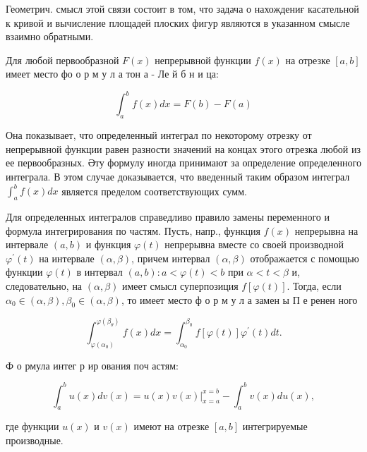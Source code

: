 \documentclass[10pt]{article}
\begin{document}
Геометрич. смысл этой связи состоит в том, что задача о нахождениғ касательной к кривой и вычисление площадей плоских фигур являются в указанном смысле взаимно обратными.



Для любой первообразной $F(x)$ непрерывной функции $f(x)$ на отрезке $[a, b]$ имеет место фо о р м у л а тон а - Ле й б н и ца:



\[

\int_{a}^{b} f(x) d x=F(b)-F(a)

\]



Она показывает, что определенный интеграл по некоторому отрезку от непрерывной функции равен разности значений на концах этого отрезка любой из ее первообразных. Әту формулу иногда принимают за определение определенного интеграла. В этом случае доказывается, что введенный таким образом интеграл $\int_{a}^{b} f(x) d x$ является пределом соответствующих сумм.



Для определенных интегралов справедливо правило замены переменного и формула интегрирования по частям. Пусть, напр., функция $f(x)$ непрерывна на интервале $(a, b)$ и функция $\varphi(t)$ непрерывна вместе со своей производной $\varphi^{\prime}(t)$ на интервале $(\alpha, \beta)$, причем интервал $(\alpha, \beta)$ отображается с помощью функции $\varphi(t)$ в интервал $(a, b): a<\varphi(t)<b$ при $\alpha<t<\beta$ и, следовательно, на $(\alpha, \beta)$ имеет смысл суперпозиция $f[\varphi(t)]$. Тогда, если $\alpha_{0} \in(\alpha, \beta), \beta_{0} \in(\alpha, \beta)$, то имеет место ф о р м у л а замен ы П е ренен ного



\[

\int_{\varphi\left(\alpha_{0}\right)}^{\varphi\left(\beta_{\theta}\right)} f(x) d x=\int_{\alpha_{0}}^{\beta_{0}} f[\varphi(t)] \varphi^{\prime}(t) d t .

\]



Ф о рмула интег р ир ования поч астям:



\[

\int_{a}^{b} u(x) d v(x)=\left.u(x) v(x)\right|_{x=a} ^{x=b}-\int_{a}^{b} v(x) d u(x),

\]



где функции $u(x)$ и $v(x)$ имеют на отрезке $[a, b]$ интегрируемые производные.
\end{document}
